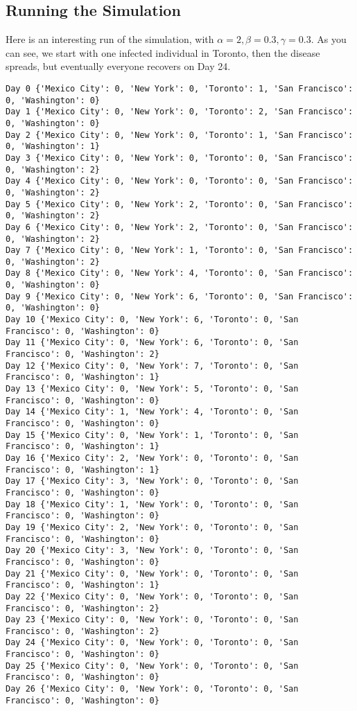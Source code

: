 \documentclass{assignment}
\begin{document}
\subsection*{Running the Simulation}

Here is an interesting run of the simulation, with $\alpha=2, \beta = 0.3, \gamma = 0.3$. As you can see, we start with one infected individual in Toronto, then the disease spreads, but eventually everyone recovers on Day 24.

\begin{verbatim}
Day 0 {'Mexico City': 0, 'New York': 0, 'Toronto': 1, 'San Francisco': 0, 'Washington': 0}
Day 1 {'Mexico City': 0, 'New York': 0, 'Toronto': 2, 'San Francisco': 0, 'Washington': 0}
Day 2 {'Mexico City': 0, 'New York': 0, 'Toronto': 1, 'San Francisco': 0, 'Washington': 1}
Day 3 {'Mexico City': 0, 'New York': 0, 'Toronto': 0, 'San Francisco': 0, 'Washington': 2}
Day 4 {'Mexico City': 0, 'New York': 0, 'Toronto': 0, 'San Francisco': 0, 'Washington': 2}
Day 5 {'Mexico City': 0, 'New York': 2, 'Toronto': 0, 'San Francisco': 0, 'Washington': 2}
Day 6 {'Mexico City': 0, 'New York': 2, 'Toronto': 0, 'San Francisco': 0, 'Washington': 2}
Day 7 {'Mexico City': 0, 'New York': 1, 'Toronto': 0, 'San Francisco': 0, 'Washington': 2}
Day 8 {'Mexico City': 0, 'New York': 4, 'Toronto': 0, 'San Francisco': 0, 'Washington': 0}
Day 9 {'Mexico City': 0, 'New York': 6, 'Toronto': 0, 'San Francisco': 0, 'Washington': 0}
Day 10 {'Mexico City': 0, 'New York': 6, 'Toronto': 0, 'San Francisco': 0, 'Washington': 0}
Day 11 {'Mexico City': 0, 'New York': 6, 'Toronto': 0, 'San Francisco': 0, 'Washington': 2}
Day 12 {'Mexico City': 0, 'New York': 7, 'Toronto': 0, 'San Francisco': 0, 'Washington': 1}
Day 13 {'Mexico City': 0, 'New York': 5, 'Toronto': 0, 'San Francisco': 0, 'Washington': 0}
Day 14 {'Mexico City': 1, 'New York': 4, 'Toronto': 0, 'San Francisco': 0, 'Washington': 0}
Day 15 {'Mexico City': 0, 'New York': 1, 'Toronto': 0, 'San Francisco': 0, 'Washington': 1}
Day 16 {'Mexico City': 2, 'New York': 0, 'Toronto': 0, 'San Francisco': 0, 'Washington': 1}
Day 17 {'Mexico City': 3, 'New York': 0, 'Toronto': 0, 'San Francisco': 0, 'Washington': 0}
Day 18 {'Mexico City': 1, 'New York': 0, 'Toronto': 0, 'San Francisco': 0, 'Washington': 0}
Day 19 {'Mexico City': 2, 'New York': 0, 'Toronto': 0, 'San Francisco': 0, 'Washington': 0}
Day 20 {'Mexico City': 3, 'New York': 0, 'Toronto': 0, 'San Francisco': 0, 'Washington': 0}
Day 21 {'Mexico City': 0, 'New York': 0, 'Toronto': 0, 'San Francisco': 0, 'Washington': 1}
Day 22 {'Mexico City': 0, 'New York': 0, 'Toronto': 0, 'San Francisco': 0, 'Washington': 2}
Day 23 {'Mexico City': 0, 'New York': 0, 'Toronto': 0, 'San Francisco': 0, 'Washington': 2}
Day 24 {'Mexico City': 0, 'New York': 0, 'Toronto': 0, 'San Francisco': 0, 'Washington': 0}
Day 25 {'Mexico City': 0, 'New York': 0, 'Toronto': 0, 'San Francisco': 0, 'Washington': 0}
Day 26 {'Mexico City': 0, 'New York': 0, 'Toronto': 0, 'San Francisco': 0, 'Washington': 0}
\end{verbatim}
\end{document}
